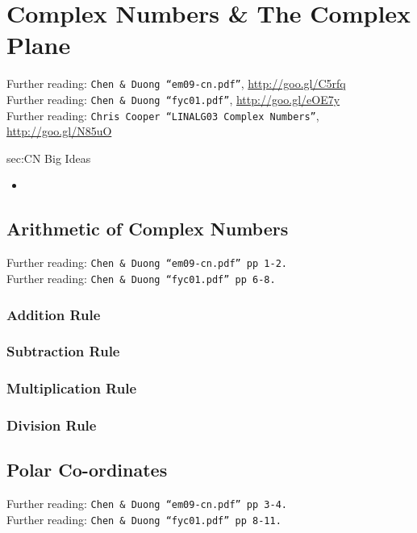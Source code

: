 \chapter{Complex Numbers \& The Complex Plane}
\label{chap:CN}
Further reading: \texttt{Chen \& Duong ``em09-cn.pdf''}, \url{http://goo.gl/C5rfq} \\
Further reading: \texttt{Chen \& Duong ``fyc01.pdf''}, \url{http://goo.gl/eOE7y} \\
Further reading: \texttt{Chris Cooper ``LINALG03 Complex Numbers''}, \url{http://goo.gl/N85uO}

\begin{bigideas}{sec:CN Big Ideas}
\begin{itemize}
  \item 
\end{itemize}
\end{bigideas}

\section{Arithmetic of Complex Numbers}
\label{sec:CN Arithmetic of Complex Numbers}
Further reading: \texttt{Chen \& Duong ``em09-cn.pdf'' pp 1-2.} \\
Further reading: \texttt{Chen \& Duong ``fyc01.pdf'' pp 6-8.}

\subsection{Addition Rule}
\label{subsec:CN Arithmetic of Complex Numbers - Addition}

\subsection{Subtraction Rule}
\label{subsec:CN Arithmetic of Complex Numbers - Subtraction}

\subsection{Multiplication Rule}
\label{subsec:CN Arithmetic of Complex Numbers - Multiplication}

\subsection{Division Rule}
\label{subsec:CN Arithmetic of Complex Numbers - Division}

\section{Polar Co-ordinates}
\label{sec:CN Polar Co-ordinates}
Further reading: \texttt{Chen \& Duong ``em09-cn.pdf'' pp 3-4.} \\
Further reading: \texttt{Chen \& Duong ``fyc01.pdf'' pp 8-11.}